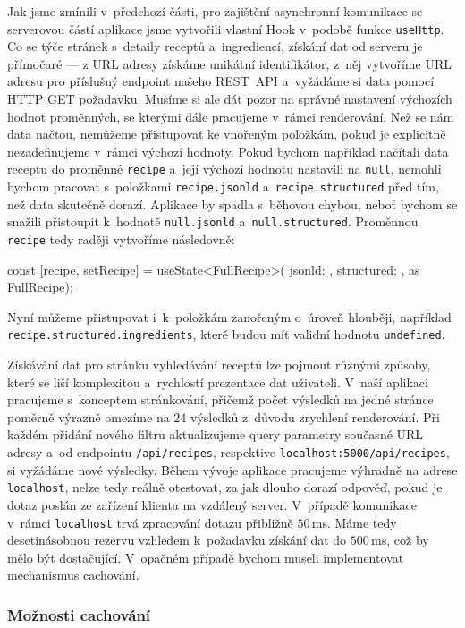 Jak jsme zmínili v~předchozí části, pro zajištění asynchronní komunikace se serverovou částí aplikace jsme vytvořili vlastní Hook v~podobě funkce \texttt{useHttp}. Co se týče stránek s~detaily receptů a~ingrediencí, získání dat od serveru je přímočaré --- z URL adresy získáme unikátní identifikátor, z~něj vytvoříme URL adresu pro příslušný endpoint našeho REST~API a~vyžádáme si data pomocí HTTP GET požadavku. Musíme si ale dát pozor na správné nastavení výchozích hodnot proměnných, se kterými dále pracujeme v~rámci renderování. Než se nám data načtou, nemůžeme přistupovat ke vnořeným položkám, pokud je explicitně nezadefinujeme v~rámci výchozí hodnoty. Pokud bychom například načítali data receptu do proměnné \texttt{recipe} a~její výchozí hodnotu nastavili na \texttt{null}, nemohli bychom pracovat s~položkami \texttt{recipe.jsonld} a~\texttt{recipe.structured} před tím, než data skutečně dorazí. Aplikace by spadla s~běhovou chybou, neboť bychom se snažili přistoupit k~hodnotě \texttt{null.jsonld} a~\texttt{null.structured}. Proměnnou \texttt{recipe} tedy raději vytvoříme následovně:
\begingroup
\samepage
\begin{code}
const [recipe, setRecipe] = useState<FullRecipe>({
  jsonld: {},
  structured: {},
} as FullRecipe);
\end{code}
Nyní můžeme přistupovat i~k~položkám zanořeným o~úroveň hlouběji, například \texttt{recipe.structured.ingredients}, které budou mít validní hodnotu \texttt{undefined}.
\endgroup

Získávání dat pro stránku vyhledávání receptů lze pojmout různými způsoby, které se liší komplexitou a~rychlostí prezentace dat uživateli. V~naší aplikaci pracujeme s~konceptem stránkování, přičemž počet výsledků na jedné stránce poměrně výrazně omezíme na $24$ výsledků z~důvodu zrychlení renderování. Při každém přidání nového filtru aktualizujeme query parametry současné URL adresy a~od endpointu \texttt{/api/recipes}, respektive \texttt{localhost:5000/api/recipes}, si vyžádáme nové výsledky. Během vývoje aplikace pracujeme výhradně na adrese \texttt{localhost}, nelze tedy reálně otestovat, za jak dlouho dorazí odpověď, pokud je dotaz poslán ze zařízení klienta na vzdálený server. V~případě komunikace v~rámci \texttt{localhost} trvá zpracování dotazu přibližně $50\,$ms. Máme tedy desetinásobnou rezervu vzhledem k~požadavku získání dat do $500\,$ms, což by mělo být dostačující. V~opačném případě bychom museli implementovat mechanismus cachování.

\subsubsection{Možnosti cachování}

